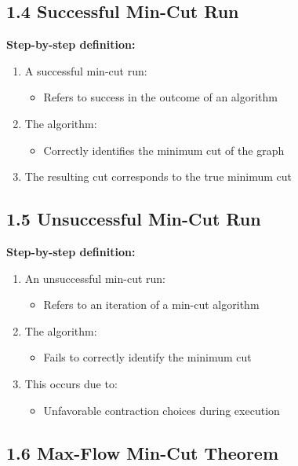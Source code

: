\documentclass[11pt]{article}
\begin{document}
\subsection*{1.4 Successful Min-Cut Run}

\textbf{Step-by-step definition:}
\begin{enumerate}
    \item A successful min-cut run:
    \begin{itemize}
        \item Refers to success in the outcome of an algorithm
    \end{itemize}
    \item The algorithm:
    \begin{itemize}
        \item Correctly identifies the minimum cut of the graph
    \end{itemize}
    \item The resulting cut corresponds to the true minimum cut
\end{enumerate}

\subsection*{1.5 Unsuccessful Min-Cut Run}

\textbf{Step-by-step definition:}
\begin{enumerate}
    \item An unsuccessful min-cut run:
    \begin{itemize}
        \item Refers to an iteration of a min-cut algorithm
    \end{itemize}
    \item The algorithm:
    \begin{itemize}
        \item Fails to correctly identify the minimum cut
    \end{itemize}
    \item This occurs due to:
    \begin{itemize}
        \item Unfavorable contraction choices during execution
    \end{itemize}
\end{enumerate}

\subsection*{1.6 Max-Flow Min-Cut Theorem}
\end{document}
